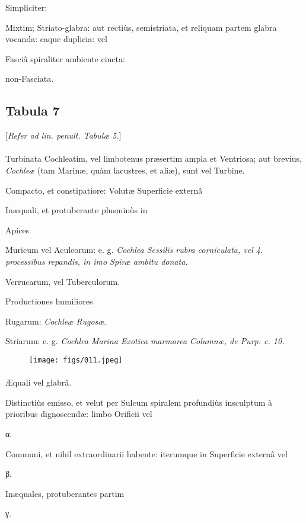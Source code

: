 \documentclass[a4paper, 11pt, oneside, polutonikogreek, german]{article}
\begin{document}
Simpliciter:

Mixtim; Striato-glabra: aut rectiùs, semistriata, et reliquam partem glabra vocanda: eaque duplicia: vel

Fasciâ spiraliter ambiente cincta:

non-Fasciata.
\clearpage
\subsection{Tabula 7}
\begin{center}
[\emph{Refer ad lin. penult. Tabulæ 5.}]
\end{center}
\paragraph{}
Turbinata Cochleatim, vel limbotenus præsertim ampla et Ventriosa; aut brevius, \emph{Cochleæ} (tam Marinæ, quàm lacustres, et aliæ), sunt vel Turbine.

Compacto, et constipatiore: Volutæ Superficie externâ

Inæquali, et protuberante plusminùs in

Apices

Muricum vel Aculeorum: e. g. \emph{Cochlea Sessilis rubra corniculata, vel 4. processibus repandis, in imo Spiræ ambitu donata.}

Verrucarum, vel Tuberculorum.

Productiones humiliores

Rugarum: \emph{Cochleæ Rugosæ}.

Striarum: e. g. \emph{Cochlea Marina Exotica marmorea Columnæ, de Purp. c. 10.}

\begin{figure}[H]
\centering
\texttt{[image: figs/011.jpeg]}
\end{figure}
\paragraph{}
Æquali vel glabrâ.

Distinctiùs emisso, et velut per Sulcum spiralem profundiùs insculptum à prioribus dignoscendæ: limbo Orificii vel

α.

Communi, et nihil extraordinarii habente: iterumque in Superficie externâ vel

β.

Inæquales, protuberantes partim

γ.
\end{document}
